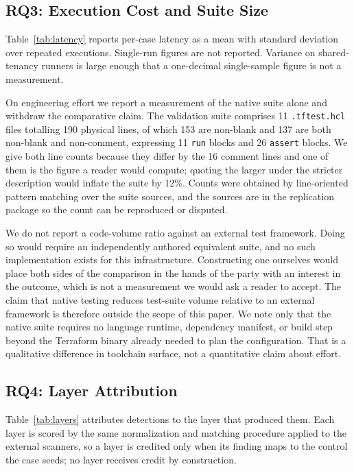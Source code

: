 \documentclass[journal]{IEEEtran}
\newcommand{\resulttable}[1]{%
  \IfFileExists{../results/tables/#1.tex}%
    {}%
    {\begin{table}[!t]\centering\small
       \fbox{\parbox{0.9\columnwidth}{\centering
         \texttt{\detokenize{results/tables/#1.tex}} not found.\\[2pt]
         Run \texttt{experiments/run\_baselines.sh} to generate it.}}%
     \end{table}}}
\renewcommand{\resulttable}[1]{}
\begin{document}
\subsection{RQ3: Execution Cost and Suite Size}
\label{sec:rq3}
\resulttable{latency}

Table~\ref{tab:latency} reports per-case latency as a mean with standard
deviation over repeated executions. Single-run figures are not reported. Variance
on shared-tenancy runners is large enough that a one-decimal single-sample figure
is not a measurement.

On engineering effort we report a measurement of the native suite alone and
withdraw the comparative claim. The validation suite comprises 11
\texttt{.tftest.hcl} files totalling 190 physical lines, of which 153 are non-blank
and 137 are both non-blank and non-comment, expressing 11 \texttt{run} blocks and
26 \texttt{assert} blocks. We give both line counts because they differ by the 16
comment lines and one of them is the figure a reader would compute; quoting the
larger under the stricter description would inflate the suite by 12\%. Counts were
obtained by line-oriented pattern matching over the suite sources, and the sources
are in the replication package so the count can be reproduced or disputed.

We do not report a code-volume ratio against an external test framework. Doing so
would require an independently authored equivalent suite, and no such
implementation exists for this infrastructure. Constructing one ourselves would
place both sides of the comparison in the hands of the party with an interest in
the outcome, which is not a measurement we would ask a reader to accept. The
claim that native testing reduces test-suite volume relative to an external
framework is therefore outside the scope of this paper. We note only that the
native suite requires no language runtime, dependency manifest, or build step
beyond the Terraform binary already needed to plan the configuration. That is a
qualitative difference in toolchain surface, not a quantitative claim about
effort.

\subsection{RQ4: Layer Attribution}
\resulttable{layers}

Table~\ref{tab:layers} attributes detections to the layer that produced them.
Each layer is scored by the same normalization and matching procedure applied to
the external scanners, so a layer is credited only when its finding maps to the
control the case seeds; no layer receives credit by construction.
\end{document}
